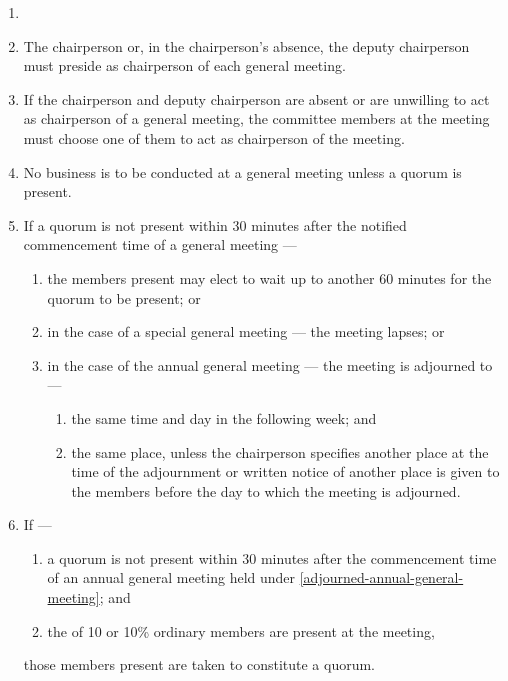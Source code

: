 \documentclass[../constitution.tex]{subfiles}
\begin{document}
\begin{enumerate}

\item {} 
\item The chairperson or, in the chairperson's absence, the deputy chairperson must preside as chairperson of each general meeting.
\item If the chairperson and deputy chairperson are absent or are unwilling to act as chairperson of a general meeting, the committee members at the meeting must choose one of them to act as chairperson of the meeting.
\item No business is to be conducted at a general meeting unless a quorum is present.
\item If a quorum is not present within 30 minutes after the notified commencement time of a general meeting ---

  \begin{enumerate}
  
  \item the members present may elect to wait up to another 60 minutes for the quorum to be present; or 
  \item in the case of a special general meeting --- the meeting lapses; or
  \item in the case of the annual general meeting --- the meeting is adjourned to --- \label{adjourned-annual-general-meeting}

    \begin{enumerate}
    
    \item the same time and day in the following week; and
    \item the same place, unless the chairperson specifies another place at the time of the adjournment or written notice of another place is given to the members before the day to which the meeting is adjourned.
    \end{enumerate}
  \end{enumerate}
\item If ---

  \begin{enumerate}
  
  \item a quorum is not present within 30 minutes after the commencement time of an annual general meeting held under  \ref{adjourned-annual-general-meeting}; and
  \item the  of 10 or 10\% ordinary members are present at the meeting, 
  \end{enumerate}
  those members present are taken to constitute a quorum.
\end{enumerate}
\end{document}
